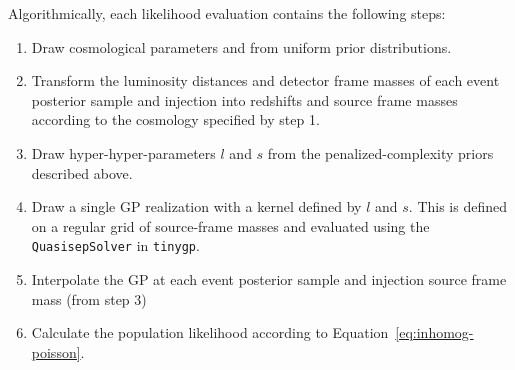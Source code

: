 \documentclass[]{aastex631}
\begin{document}
Algorithmically, each likelihood evaluation contains the following steps: %
\begin{enumerate}
    \item Draw cosmological parameters \Ho{} and \Omm{} from uniform prior distributions.
    \item Transform the luminosity distances and detector frame masses of each event posterior sample and injection into redshifts and source frame masses according to the cosmology specified by step 1.
    \item Draw hyper-hyper-parameters $l$ and $s$ from the penalized-complexity priors described above.
    \item Draw a single \ac{GP} realization with a kernel defined by $l$ and $s$.
    This is defined on a regular grid of source-frame masses and evaluated using the \texttt{QuasisepSolver} in \texttt{tinygp}.
    \item Interpolate the \ac{GP} at each event posterior sample and injection source frame mass (from step 3)
    \item Calculate the population likelihood according to Equation~\ref{eq:inhomog-poisson}.
\end{enumerate}
\end{document}
